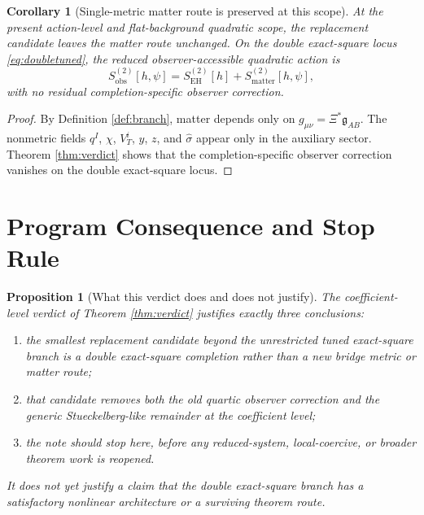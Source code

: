 \documentclass[11pt]{article}
\newcommand{\BridgeMetric}{\mathfrak{g}}
\newtheorem{proposition}{Proposition}
\newtheorem{corollary}{Corollary}
\begin{document}
\begin{corollary}[Single-metric matter route is preserved at this scope]
\label{cor:matter}
At the present action-level and flat-background quadratic scope, the replacement candidate leaves the matter route unchanged. On the double exact-square locus \eqref{eq:doubletuned}, the reduced observer-accessible quadratic action is
\begin{equation}
S_{\mathrm{obs}}^{(2)}[h,\psi]
=
S_{\mathrm{EH}}^{(2)}[h]
+S_{\mathrm{matter}}^{(2)}[h,\psi],
\label{eq:Sobs}
\end{equation}
with no residual completion-specific observer correction.
\end{corollary}

\begin{proof}
By Definition \ref{def:branch}, matter depends only on \(g_{\mu\nu}=\Xi^\ast\BridgeMetric_{AB}\). The nonmetric fields \(q^I\), \(\chi\), \(V_T^i\), \(y\), \(z\), and \(\hat\sigma\) appear only in the auxiliary sector. Theorem \ref{thm:verdict} shows that the completion-specific observer correction vanishes on the double exact-square locus.
\end{proof}

\section{Program Consequence and Stop Rule}

\begin{proposition}[What this verdict does and does not justify]
\label{prop:stop}
The coefficient-level verdict of Theorem \ref{thm:verdict} justifies exactly three conclusions:
\begin{enumerate}
    \item the smallest replacement candidate beyond the unrestricted tuned exact-square branch is a double exact-square completion rather than a new bridge metric or matter route;
    \item that candidate removes both the old quartic observer correction and the generic Stueckelberg-like remainder at the coefficient level;
    \item the note should stop here, before any reduced-system, local-coercive, or broader theorem work is reopened.
\end{enumerate}
It does \emph{not} yet justify a claim that the double exact-square branch has a satisfactory nonlinear architecture or a surviving theorem route.
\end{proposition}
\end{document}
